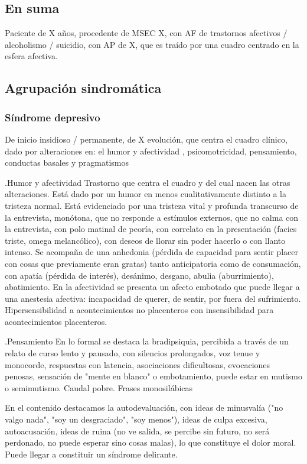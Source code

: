 \documentclass{scrbook}
\begin{document}
\subsection*{En suma}
Paciente de X años, procedente de MSEC X, con AF de trastornos afectivos / alcoholismo / suicidio, con AP de X, que es traído por una cuadro centrado en la esfera afectiva.
\subsection*{Agrupación sindromática}
\subsubsection*{Síndrome depresivo}
De inicio insidioso / permanente, de X evolución, que centra el cuadro clínico, dado por alteraciones en: el humor y afectividad , psicomotricidad, pensamiento, conductas basales y pragmatismos

.Humor y afectividad
Trastorno que centra el cuadro y del cual nacen las otras alteraciones. Está dado por un humor en menos cualitativamente distinto a la tristeza normal. Está evidenciado por una tristeza vital y profunda transcurso de la entrevista, monótona, que no responde a estímulos externos, que no calma con la entrevista, con polo matinal de peoría, con correlato en la presentación (facies triste, omega melancólico), con deseos de llorar sin poder hacerlo o con llanto intenso. Se acompaña de una anhedonia (pérdida de capacidad para sentir placer con cosas que previamente eran gratas) tanto anticipatoria como de consumación, con apatía (pérdida de interés), desánimo, desgano, abulia (aburrimiento), abatimiento. En la afectividad se presenta un afecto embotado que puede llegar a una anestesia afectiva: incapacidad de querer, de sentir, por fuera del sufrimiento. Hipersensibilidad a acontecimientos no placenteros con insensibilidad para acontecimientos placenteros.

.Pensamiento
En lo formal se destaca la bradipsiquia, percibida a través de un relato de curso lento y pausado, con silencios prolongados, voz tenue y monocorde, respuestas con latencia, asociaciones dificultosas, evocaciones penosas, sensación de "mente en blanco" o embotamiento, puede estar en mutismo o semimutismo. Caudal pobre. Frases monosilábicas

En el contenido destacamos la autodevaluación, con ideas de minusvalía ("no valgo nada", "soy un desgraciado", "soy menos"), ideas de culpa excesiva, autoacusación, ideas de ruina (no ve salida, se percibe sin futuro, no será perdonado, no puede esperar sino cosas malas), lo que constituye el dolor moral. Puede llegar a constituir un síndrome delirante.
\end{document}
